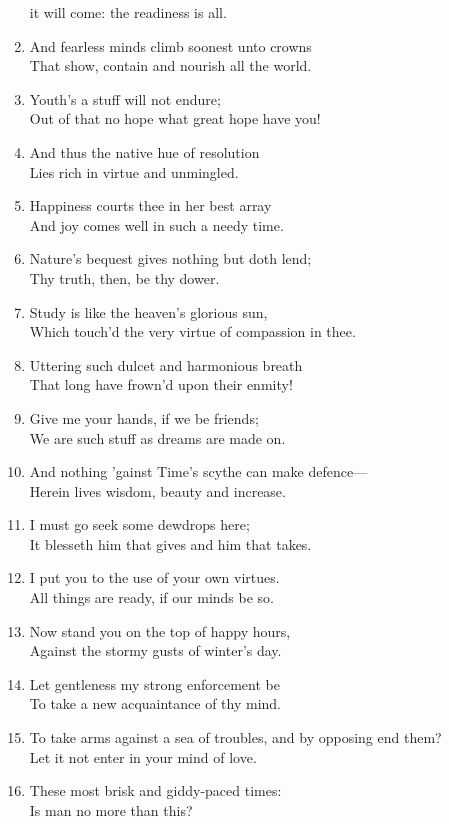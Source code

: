\documentclass[17pt]{extarticle}
\begin{document}
\begin{enumerate}
  it will come: the readiness is all.
\item
  And fearless minds climb soonest unto crowns\\That show, contain and
  nourish all the world.
\item
  Youth's a stuff will not endure;\\Out of that no hope what great hope
  have you!
\item
  And thus the native hue of resolution\\Lies rich in virtue and
  unmingled.
\item
  Happiness courts thee in her best array\\And joy comes well in such a
  needy time.
\item
  Nature's bequest gives nothing but doth lend;\\Thy truth, then, be thy
  dower.
\item
  Study is like the heaven's glorious sun,\\Which touch'd the very
  virtue of compassion in thee.
\item
  Uttering such dulcet and harmonious breath\\That long have frown'd
  upon their enmity!
\item
  Give me your hands, if we be friends;\\We are such stuff as dreams are
  made on.
\item
  And nothing 'gainst Time's scythe can make defence---\\Herein lives
  wisdom, beauty and increase.
\item
  I must go seek some dewdrops here;\\It blesseth him that gives and him
  that takes.
\item
  I put you to the use of your own virtues.\\All things are ready, if
  our minds be so.
\item
  Now stand you on the top of happy hours,\\Against the stormy gusts of
  winter's day.
\item
  Let gentleness my strong enforcement be\\To take a new acquaintance of
  thy mind.
\item
  To take arms against a sea of troubles, and by opposing end them?\\Let
  it not enter in your mind of love.
\item
  These most brisk and giddy-paced times:\\Is man no more than this?

\end{enumerate}
\end{document}
